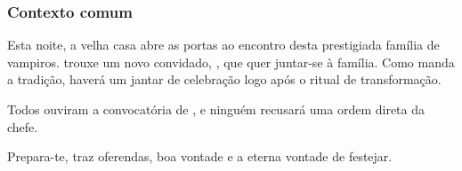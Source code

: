 \subsubsection{Contexto comum}

Esta noite, a velha casa abre as portas ao encontro desta prestigiada família de vampiros.  trouxe um novo convidado, , que quer juntar-se à família. Como manda a tradição, haverá um jantar de celebração logo após o ritual de transformação.

Todos ouviram a convocatória de , e ninguém recusará uma ordem direta da chefe.

Prepara-te, traz oferendas, boa vontade e a eterna vontade de festejar.
